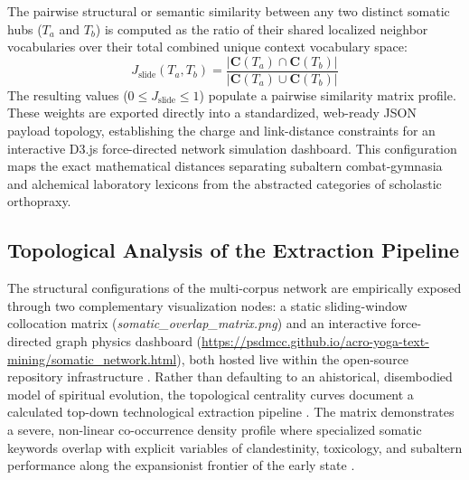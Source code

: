 \documentclass[11pt,twoside,letterpaper]{article}
\begin{document}
The pairwise structural or semantic similarity between any two distinct somatic hubs ($T_a$ and $T_b$) is computed as the ratio of their shared localized neighbor vocabularies over their total combined unique context vocabulary space:
\begin{equation}
J_{\text{slide}}(T_a, T_b) = \frac{\vert\mathbf{C}(T_a) \cap \mathbf{C}(T_b)\vert}{\vert\mathbf{C}(T_a) \cup \mathbf{C}(T_b)\vert}
\end{equation}
The resulting values ($0 \le J_{\text{slide}} \le 1$) populate a pairwise similarity matrix profile. These weights are exported directly into a standardized, web-ready JSON payload topology, establishing the charge and link-distance constraints for an interactive D3.js force-directed network simulation dashboard. This configuration maps the exact mathematical distances separating subaltern combat-gymnasia and alchemical laboratory lexicons from the abstracted categories of scholastic orthopraxy.

\subsection{Topological Analysis of the Extraction Pipeline}
The structural configurations of the multi-corpus network are empirically exposed through two complementary visualization nodes: a static sliding-window collocation matrix (\textit{somatic\_overlap\_matrix.png}) and an interactive force-directed graph physics dashboard (\href{https://github.io}{https://psdmcc.github.io/acro-yoga-text-mining/somatic\_network.html}), both hosted live within the open-source repository infrastructure \citet{McCartney2021}. Rather than defaulting to an ahistorical, disembodied model of spiritual evolution, the topological centrality curves document a calculated top-down technological extraction pipeline \citep{Mallinson2017}. The matrix demonstrates a severe, non-linear co-occurrence density profile where specialized somatic keywords overlap with explicit variables of clandestinity, toxicology, and subaltern performance along the expansionist frontier of the early state \citep{Mallinson2017, McCartney2021}.
\end{document}
